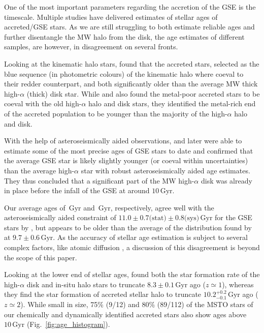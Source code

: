\documentclass[fleqn,usenatbib]{mnras}
\newcommand{\Gyr}{\,\mathrm{Gyr}}	%
\begin{document}
One of the most important parameters regarding the accretion of the GSE is the timescale. Multiple studies \citep[e.g.][]{Jofre2010, Schuster2012, Hawkins2014, Gallart2019, Das2020, Montalban2020} have delivered estimates of stellar ages of accreted/GSE stars. As we are still struggling to both estimate reliable ages and further disentangle the MW halo from the disk, the age estimates of different samples, are however, in disagreement on several fronts.

Looking at the kinematic halo stars, \citet{Gallart2019} found that the accreted stars, selected as the blue sequence (in photometric colours) of the kinematic halo where coeval to their redder counterpart, and both significantly older than the average MW thick high-$\alpha$ (thick) disk star. While \citet{Schuster2012} and \citet{Hawkins2014} also found the metal-poor accreted stars to be coeval with the old high-$\alpha$ halo and disk stars, they identified the metal-rich end of the accreted population to be younger than the majority of the high-$\alpha$ halo and disk.

With the help of asteroseismically aided observations, \citet{Chaplin2020} and later \citet{Montalban2020} were able to estimate some of the most precise ages of GSE stars to date and confirmed that the average GSE star is likely slightly younger (or coeval within uncertainties) than the average high-$\alpha$ star with robust asteroseismically aided age estimates. They thus concluded that a significant part of the MW high-$\alpha$ disk was already in place before the infall of the GSE at around $10\Gyr$.

Our average ages of $\Gyr$ and $\Gyr$, respectively, agree well with the asteroseismically aided constraint of $11.0 \pm 0.7 \text{(stat)} \pm 0.8 \text{(sys)} \Gyr$ for the GSE stars by \citet{Chaplin2020}, but appears to be older than the average of the distribution found by \citet{Montalban2020} at $9.7\pm0.6\Gyr$. As the accuracy of stellar age estimation is subject to several complex factors, like atomic diffusion \citep[see e.g.][]{Jofre2011}, a discussion of this disagreement is beyond the scope of this paper.

Looking at the lower end of stellar ages, \citet{Bonaca2020} found both the star formation rate of the high-$\alpha$ disk and in-situ halo stars to truncate $8.3 \pm 0.1 \Gyr$ ago ($z \simeq 1$), whereas they find the star formation of accreted stellar halo to truncate $10.2_{-0.1}^{+0.2} \Gyr$ ago ($z \simeq 2$). While small in size, 75\% (9/12) and 80\% (89/112) of the MSTO stars of our chemically and dynamically identified accreted stars also show ages above $10\Gyr$ (Fig.~\ref{fig:age_histogram}).
\end{document}
